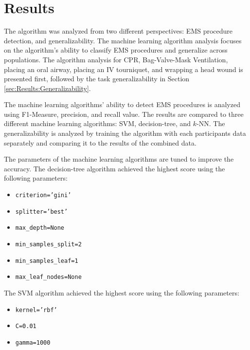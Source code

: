 
\chapter{Results}
\label{ch:Results}

The algorithm was analyzed from two different perspectives: EMS procedure detection, and generalizability. The machine learning algorithm analysis focuses on the algorithm’s ability to classify EMS procedures and generalize across populations. The algorithm analysis for CPR, Bag-Valve-Mask Ventilation, placing an oral airway, placing an IV tourniquet, and wrapping a head wound is presented first, followed by the task generalizability in Section \ref{sec:Results:Generalizability}.
\par The machine learning algorithms' ability to detect EMS procedures is analyzed using F1-Measure, precision, and recall value. The results are compared to three different machine learning algorithms: SVM, decision-tree, and $k$-NN. The generalizability is analyzed by training the algorithm with each participants data separately and comparing it to the results of the combined data.
\par The parameters of the machine learning algorithms are tuned to improve the accuracy. The decision-tree algorithm achieved the highest score using the following parameters:
\begin{itemize}
	\item \texttt{criterion='gini'}
	\item \texttt{splitter='best'}
	\item \texttt{max\_depth=None}
	\item \texttt{min\_samples\_split=2}
	\item \texttt{min\_samples\_leaf=1}
	\item \texttt{max\_leaf\_nodes=None}
\end{itemize}
The SVM algorithm achieved the highest score using the following parameters:
\begin{itemize}
	\item \texttt{kernel='rbf'}
	\item \texttt{C=0.01}
	\item \texttt{gamma=1000}
\end{itemize}
